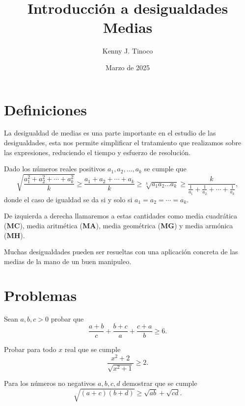 \documentclass[12pt]{article}
\title{Introducción a desigualdades\\Medias}
\author{Kenny J. Tinoco}
\date{Marzo de 2025}
\begin{document}
    \maketitle

    \section{Definiciones}

    La desigualdad de medias es una parte importante en el estudio de las desigualdades, esta nos permite
    simplificar el tratamiento que realizamos sobre las expresiones, reduciendo el tiempo y esfuerzo de resolución.

    \begin{theorem}
        Dado los números reales positivos $a_1, a_2, \ldots , a_k$ se cumple que
        \[
            \sqrt {\frac{a_1^2 + a_2^2 + \cdots + a_k^2}{k}} \geq \frac{a_1 + a_2 + \cdots + a_k}{k} \geq \sqrt[k]{a_1 a_2 \ldots a_k} \geq \frac{k}{\frac{1}{a_1} + \frac{1}{a_2} + \cdots + \frac{1}{a_k}},
        \]
        donde el caso de igualdad se da si y solo si $a_1 = a_2 = \cdots = a_k$.
    \end{theorem}

    De izquierda a derecha llamaremos a estas cantidades como media cuadrática (\textbf{MC}), media aritmética (\textbf{MA}), media geométrica (\textbf{MG}) y media armónica (\textbf{MH}).

    Muchas desigualdades pueden ser resueltas con una aplicación concreta de las medias de la mano de un buen manipuleo.

    \section{Problemas}

    \begin{prob-without-section}
        Sean $a,b,c > 0$ probar que
        \[
            \frac{a + b}{c} + \frac{b + c}{a} + \frac{c + a}{b} \geq 6.
        \]
    \end{prob-without-section}

    \begin{prob-without-section}
        Probar para todo $x$ real que se cumple
        \[
            \frac{x^2 + 2}{\sqrt {x^2 + 1}} \geq 2.
        \]
    \end{prob-without-section}

    \begin{prob-without-section}
        Para los números no negativos $a,b,c,d$ demostrar que se cumple
        \[
            \sqrt {(a + c)(b + d)} \geq \sqrt {ab} + \sqrt {cd}.
        \]
    \end{prob-without-section}
\end{document}
